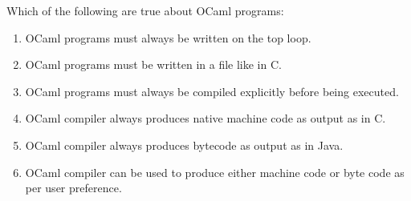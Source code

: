 \question Which of the following are true about OCaml programs:
\begin{enumerate}
\item OCaml programs must always be written on the top loop.
\item OCaml programs must be written in a file like in C.
\item OCaml programs must always be compiled explicitly before being executed.
\item OCaml compiler always produces native machine code as output as in C.
\item OCaml compiler always produces bytecode as output as in Java.
\item OCaml compiler can be used to produce either machine code or byte code as per user preference.
\end{enumerate}